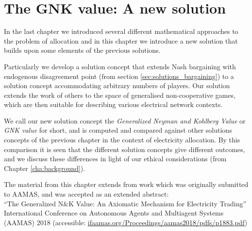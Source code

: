 \chapter{The GNK value: A new solution}
\label{cha:new_solution}

In the last chapter we introduced several different mathematical approaches to the problem of allocation and in this chapter we introduce a new solution that builds upon some elements of the previous solutions.

Particularly we develop a solution concept that extends Nash bargaining with endogenous disagreement point (from section \ref{sec:solutions_bargaining}) to a solution concept accommodating arbitrary numbers of players.
Our solution extends the work of others to the space of generalised non-cooperative games, which are then suitable for describing various electrical network contexts.

We call our new solution concept the \textit{Generalized Neyman and Kohlberg Value} or \textit{GNK value} for short, and is computed and compared against other solutions concepts of the previous chapter in the context of electricity allocation.
By this comparison it is seen that the different solution concepts give different outcomes, and we discuss these differences in light of our ethical considerations (from Chapter \ref{cha:background}).

The material from this chapter extends from work which was originally submitted to AAMAS, and was accepted as an extended abstract: \\
\-\hspace{5mm}``The Generalized N\&K Value: An Axiomatic Mechanism for Electricity Trading''\\ International Conference on Autonomous Agents and Multiagent Systems\\ (AAMAS) 2018 (accessible: \href{ifaamas.org/Proceedings/aamas2018/pdfs/p1883.pdf}{ifaamas.org/Proceedings/aamas2018/pdfs/p1883.pdf})


